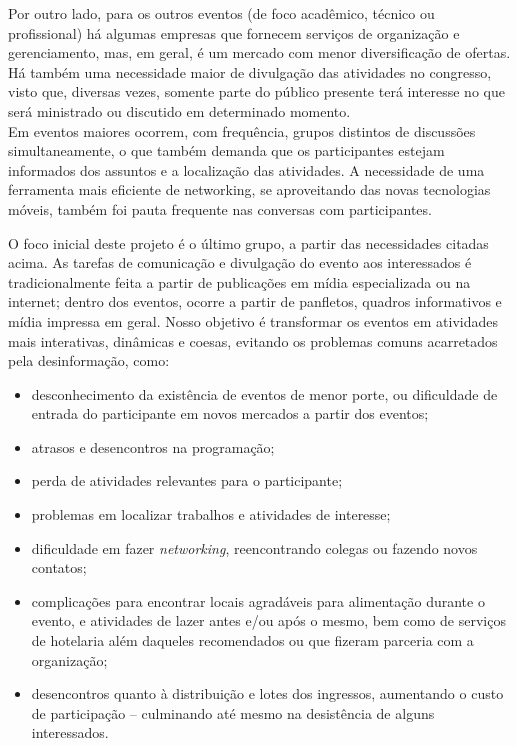 \documentclass[12pt,a4paper,twoside,hyphens,english,brazil]{abntex2}
\begin{document}
Por outro lado, para os outros eventos (de foco acadêmico, técnico ou profissional) há algumas empresas que fornecem serviços de organização e gerenciamento, mas, em geral, é um mercado com menor diversificação de ofertas. Há também uma necessidade maior de divulgação das atividades no congresso, visto que, diversas vezes, somente parte do público presente terá interesse no que será ministrado ou discutido em determinado momento.\\
Em eventos maiores ocorrem, com frequência, grupos distintos de discussões simultaneamente, o que também demanda que os participantes estejam informados dos assuntos e a localização das atividades. A necessidade de uma ferramenta mais eficiente de networking, se aproveitando das novas tecnologias móveis, também foi pauta frequente nas conversas com participantes.

O foco inicial deste projeto é o último grupo, a partir das necessidades citadas acima. As tarefas de comunicação e divulgação do evento aos interessados é tradicionalmente feita a partir de publicações em mídia especializada ou na internet; dentro dos eventos, ocorre a partir de panfletos, quadros informativos e mídia impressa em geral. Nosso objetivo é transformar os eventos em atividades mais interativas, dinâmicas e coesas, evitando os problemas comuns acarretados pela desinformação, como:

\begin{itemize}[itemsep=-1ex]
	\item desconhecimento da existência de eventos de menor porte, ou dificuldade de entrada do participante em novos mercados a partir dos eventos;
	\item atrasos e desencontros na programação;
	\item perda de atividades relevantes para o participante;
	\item problemas em localizar trabalhos e atividades de interesse;
	\item dificuldade em fazer \emph{networking}, reencontrando colegas ou fazendo novos contatos;
	\item complicações para encontrar locais agradáveis para alimentação durante o evento, e atividades de lazer antes e/ou após o mesmo, bem como de serviços de hotelaria além daqueles recomendados ou que fizeram parceria com a organização;
	\item desencontros quanto à distribuição e lotes dos ingressos, aumentando o custo de participação -- culminando até mesmo na desistência de alguns interessados.
\end{itemize}
\end{document}
